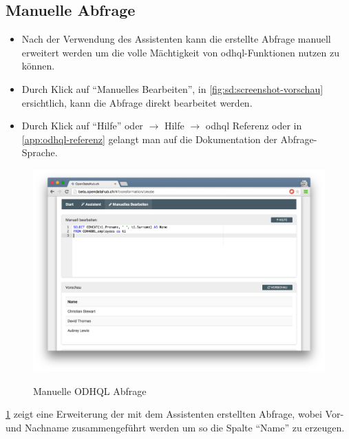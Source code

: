 \subsection{Manuelle Abfrage}

\begin{itemize}
\item Nach der Verwendung des Assistenten kann die erstellte Abfrage manuell erweitert werden um die volle Mächtigkeit von \acs{odhql}-Funktionen nutzen zu können. 
\item Durch Klick auf ``Manuelles Bearbeiten'', in \cref{fig:sd:screenshot-vorschau} ersichtlich, kann die Abfrage direkt bearbeitet werden.
\item Durch Klick auf ``Hilfe'' oder  $\to$ Hilfe $\to$ \acs{odhql} Referenz oder in \vref{app:odhql-referenz} gelangt man auf die Dokumentation der Abfrage-Sprache.
\end{itemize}

\begin{figure}[H]
	\centering
	\includegraphics[width=\linewidth]{fig/screenshot-manuelles-bearbeiten}
	\label{fig:sd:screenshot-manuelles-bearbeiten}
	\caption{Manuelle ODHQL Abfrage}
\end{figure}

\cref{fig:sd:screenshot-manuelles-bearbeiten} zeigt eine Erweiterung der mit dem Assistenten erstellten Abfrage, wobei Vor- und Nachname zusammengeführt werden um so die Spalte ``Name'' zu erzeugen.
